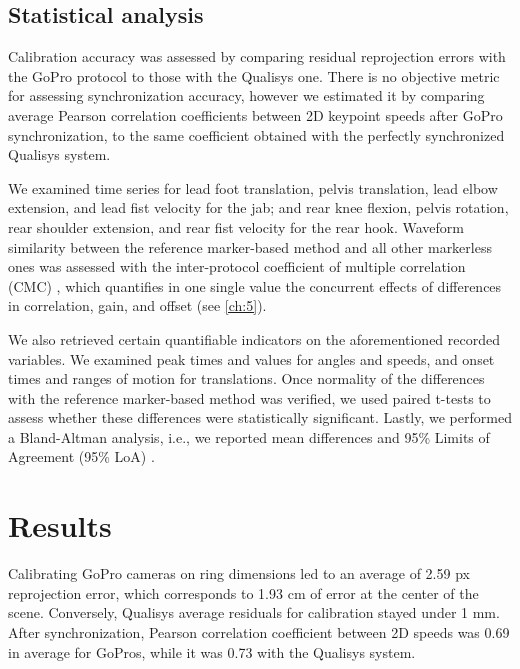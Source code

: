 \subsection{Statistical analysis}

Calibration accuracy was assessed by comparing residual reprojection errors with the GoPro protocol to those with the Qualisys one. There is no objective metric for assessing synchronization accuracy, however we estimated it by comparing average Pearson correlation coefficients between 2D keypoint speeds after GoPro synchronization, to the same coefficient obtained with the perfectly synchronized Qualisys system.

We examined time series for lead foot translation, pelvis translation, lead elbow extension, and lead fist velocity for the jab; and rear knee flexion, pelvis rotation, rear shoulder extension, and rear fist velocity for the rear hook. 
Waveform similarity between the reference marker-based method and all other markerless ones was assessed with the inter-protocol coefficient of multiple correlation (CMC) \cite{Ferrari2010}, which quantifies in one single value the concurrent effects of differences in correlation, gain, and offset (see  \autoref{ch:5}).

We also retrieved certain quantifiable indicators on the aforementioned recorded variables. We examined peak times and values for angles and speeds, and onset times and ranges of motion for translations. Once normality of the differences with the reference marker-based method was verified, we used paired t-tests to assess whether these differences were statistically significant. Lastly, we performed a Bland-Altman analysis, i.e., we reported mean differences and 95\% Limits of Agreement (95\% LoA) \cite{Bland1986}. 





\newpage
\section{Results}

Calibrating GoPro cameras on ring dimensions led to an average of 2.59 px reprojection error, which corresponds to 1.93 cm of error at the center of the scene. Conversely, Qualisys average residuals for calibration stayed under 1 mm. After synchronization, Pearson correlation coefficient between 2D speeds was 0.69 in average for GoPros, while it was 0.73 with the Qualisys system. 

